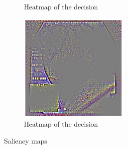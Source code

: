 \begin{figure}
\begin{subfigure}[b]{0.3\textwidth}
         \caption{Heatmap of the decision}
         \label{fig:sal2}
     \end{subfigure}     
     \hfill
     \begin{subfigure}[b]{0.3\textwidth}
         \centering
         \includegraphics[width=\textwidth]{methodology/figures/sal3.png}
         \caption{Heatmap of the decision}
         \label{fig:sal3}
     \end{subfigure}
     \caption{Saliency maps}
     \label{fig:Saliencymasks}
\end{figure}

